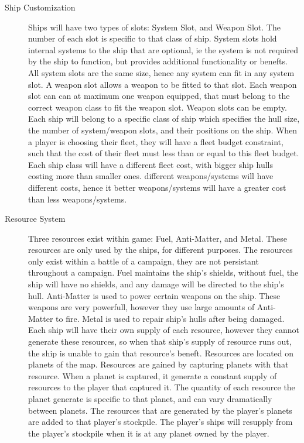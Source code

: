 \begin{description}
\item[Ship Customization]
Ships will have two types of slots: System Slot, and Weapon Slot.
The number of each slot is specific to that class of ship.
System slots hold internal systems to the ship that are optional, ie the system is not required by the ship to function, but provides additional functionality or benefts.
All system slots are the same size, hence any system can fit in any system slot.
A weapon slot allows a weapon to be fitted to that slot.
Each weapon slot can can at maximum one weapon equipped, that must belong to the correct weapon class to fit the weapon slot.
Weapon slots can be empty.
Each ship will belong to a specific class of ship which specifies the hull size, the number of system/weapon slots, and their positions on the ship.
When a player is choosing their fleet, they will have a fleet budget constraint, such that the cost of their fleet must less than or equal to this fleet budget.
Each ship class will have a different fleet cost, with bigger ship hulls costing more than smaller ones.
different weapons/systems will have different costs, hence it better weapons/systems will have a greater cost than less weapons/systems.


\item[Resource System]
Three resources exist within game: Fuel, Anti-Matter, and Metal.
These resources are only used by the ships, for different purposes.
The resources only exist within a battle of a campaign, they are not persistant throughout a campaign.
Fuel maintains the ship's shields, without fuel, the ship will have no shields, and any damage will be directed to the ship's hull.
Anti-Matter is used to power certain weapons on the ship. These weapons are very powerfull, however they use large amounts of Anti-Matter to fire.
Metal is used to repair ship's hulls after being damaged.
Each ship will have their own supply of each resource, however they cannot generate these resources, so when that ship's supply of resource runs out, the ship is unable to gain that resource's beneft.
Resources are located on planets of the map.
Resources are gained by capturing planets with that resource.
When a planet is captured, it generate a constant supply of resources to the player that captured it.
The quantity of each resource the planet generate is specific to that planet, and can vary dramatically between planets.
The resources that are generated by the player's planets are added to that player's stockpile.
The player's ships will resupply from the player's stockpile when it is at any planet owned by the player.



\end{description}
